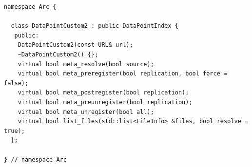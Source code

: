 \documentclass{book}
\begin{document}
\begin{verbatim}
namespace Arc {

  class DataPointCustom2 : public DataPointIndex {
   public:
    DataPointCustom2(const URL& url);
    ~DataPointCustom2() {};
    virtual bool meta_resolve(bool source);
    virtual bool meta_preregister(bool replication, bool force = false);
    virtual bool meta_postregister(bool replication);
    virtual bool meta_preunregister(bool replication);
    virtual bool meta_unregister(bool all);
    virtual bool list_files(std::list<FileInfo> &files, bool resolve = true);
  };

} // namespace Arc
\end{verbatim}


\printindex
\end{document}
